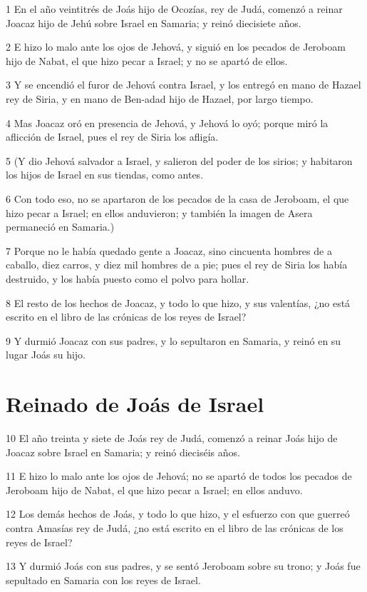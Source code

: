 \par 1 En el año veintitrés de Joás hijo de Ocozías, rey de Judá, comenzó a reinar Joacaz hijo de Jehú sobre Israel en Samaria; y reinó diecisiete años.
\par 2 E hizo lo malo ante los ojos de Jehová, y siguió en los pecados de Jeroboam hijo de Nabat, el que hizo pecar a Israel; y no se apartó de ellos.
\par 3 Y se encendió el furor de Jehová contra Israel, y los entregó en mano de Hazael rey de Siria, y en mano de Ben-adad hijo de Hazael, por largo tiempo.
\par 4 Mas Joacaz oró en presencia de Jehová, y Jehová lo oyó; porque miró la aflicción de Israel, pues el rey de Siria los afligía.
\par 5 (Y dio Jehová salvador a Israel, y salieron del poder de los sirios; y habitaron los hijos de Israel en sus tiendas, como antes.
\par 6 Con todo eso, no se apartaron de los pecados de la casa de Jeroboam, el que hizo pecar a Israel; en ellos anduvieron; y también la imagen de Asera permaneció en Samaria.)
\par 7 Porque no le había quedado gente a Joacaz, sino cincuenta hombres de a caballo, diez carros, y diez mil hombres de a pie; pues el rey de Siria los había destruido, y los había puesto como el polvo para hollar.
\par 8 El resto de los hechos de Joacaz, y todo lo que hizo, y sus valentías, ¿no está escrito en el libro de las crónicas de los reyes de Israel?
\par 9 Y durmió Joacaz con sus padres, y lo sepultaron en Samaria, y reinó en su lugar Joás su hijo.

\section*{Reinado de Joás de Israel}

\par 10 El año treinta y siete de Joás rey de Judá, comenzó a reinar Joás hijo de Joacaz sobre Israel en Samaria; y reinó dieciséis años.
\par 11 E hizo lo malo ante los ojos de Jehová; no se apartó de todos los pecados de Jeroboam hijo de Nabat, el que hizo pecar a Israel; en ellos anduvo.
\par 12 Los demás hechos de Joás, y todo lo que hizo, y el esfuerzo con que guerreó contra Amasías rey de Judá, ¿no está escrito en el libro de las crónicas de los reyes de Israel?
\par 13 Y durmió Joás con sus padres, y se sentó Jeroboam sobre su trono; y Joás fue sepultado en Samaria con los reyes de Israel.

